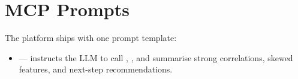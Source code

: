 \section{MCP Prompts}
\label{sec:prompts}

The platform ships with one prompt template:

\begin{itemize}[leftmargin=1.4em]
  \item {} ---
        instructs the LLM to call ,
        , and summarise strong
        correlations, skewed features, and next-step recommendations.
\end{itemize}

